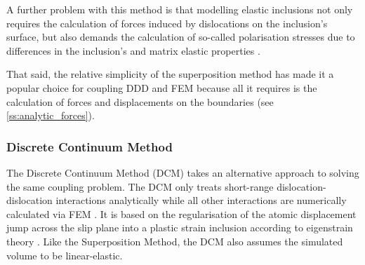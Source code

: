A further problem with this method is that modelling elastic inclusions not only requires the calculation of forces induced by dislocations on the inclusion's surface, but also demands the calculation of so-called polarisation stresses due to differences in the inclusion's and matrix elastic properties \cite{dismot, bdd, ddd_precip}.

That said, the relative simplicity of the superposition method has made it a popular choice \cite{analytic_tractions, ddd_fem_sm, ddd_fem_sm2} for coupling DDD and FEM because all it requires is the calculation of forces and displacements on the boundaries (see \cref{ss:analytic_forces}).

\subsubsection{Discrete Continuum Method}
\label{sss:discrete_continuum}

The Discrete Continuum Method (DCM) takes an alternative approach to solving the same coupling problem. The DCM only treats short-range dislocation-dislocation interactions analytically while all other interactions are numerically calculated via FEM \cite{dcm}. It is based on the regularisation of the atomic displacement jump across the slip plane into a plastic strain inclusion according to eigenstrain theory \cite{eigenstrain}. Like the Superposition Method, the DCM also assumes the simulated volume to be linear-elastic.

